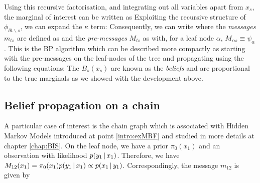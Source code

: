 Using this recursive factorisation, and integrating out all variables apart from $x_{s}$, the marginal of interest can be written as
Exploiting the recursive structure of $\phi_{\partial t\backslash s}$, we can expand the $\kappa$ term:
Consequently, we can write
where the \emph{messages} $m_{ts}$ are defined as
and the \emph{pre-messages} $M_{ts}$ as
with, for a leaf node $\alpha$, $M_{\alpha  s} \equiv \psi_\alpha$. This is the BP algorithm which can be described more compactly as starting with the pre-messages on the leaf-nodes of the tree and propagating using the following equations:
The $B_{s}(x_{s})$ are known as the \emph{beliefs} and are proportional to the true marginals as we showed with the development above. 

\subsection{Belief propagation on a chain}
A particular case of interest is the chain graph which is associated with Hidden Markov Models introduced at point \ref{intro:exMRF} and studied in more details at chapter \ref{chap:BIS}. On the leaf node, we have a prior $\pi_{0}(x_{1})$ and an observation with likelihood $p(y_{1}\,|\, x_{1})$. Therefore, we have $M_{12}(x_{1})=\pi_{0}(x_{1})p(y_{1}\,|\, x_{1})\propto p(x_{1}\,|\, y_{1})$. Correspondingly, the message $m_{12}$ is given by
